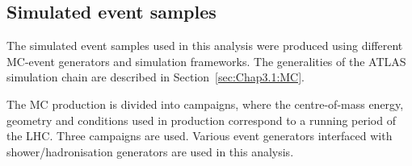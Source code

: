 \subsection{Simulated event samples}
\label{sec:ChaptH:Data_and_MC:MC}
The simulated event samples used in this analysis were produced using 
different MC-event generators and simulation frameworks. 
The generalities of the ATLAS simulation chain are described in 
Section~\ref{sec:Chap3.1:MC}.

The MC production is divided into campaigns, where the centre-of-mass energy,
geometry and conditions used in production correspond to a running period of
the LHC.  Three campaigns are used.
Various event generators interfaced with shower/hadronisation generators are used in this analysis. 


\begin{comment} %
After the event generation, the trigger and detector simulation are 
performed using the Athena.
The detector simulation is carried out either using the GEANT4 framework~\cite{GEANT4:2002zbu} 
for a detailed physics description or the \texttt{Atlfast2}~\cite{SOFT-2010-01} framework for 
faster simulation. The AFII strategy is used for the ATLAS
calorimeters, while GEANT4 is used for the rest of the simulation. 


The \pileup effect, is incorporated by overlaying the hard-scattering event 
with inelastic \pp\ events generated using \PYTHIA[8.186]~\cite{Sjostrand:2007gs}. 
The ATLAS third set of tuned parameters for minimum-bias events (A3 tune~\cite{ATL-PHYS-PUB-2016-017}) 
and the \NNPDF[2.3lo] set of PDFs~\cite{Ball:2012cx} are employed for the \pileup modelling.
\end{comment}

